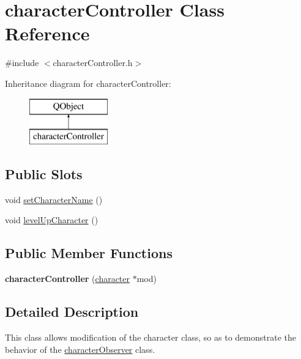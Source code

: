 \hypertarget{classcharacter_controller}{}\section{character\+Controller Class Reference}
\label{classcharacter_controller}


{\ttfamily \#include $<$character\+Controller.\+h$>$}

Inheritance diagram for character\+Controller\+:\begin{figure}[H]
\begin{center}
\leavevmode
\includegraphics[height=2.000000cm]{classcharacter_controller}
\end{center}
\end{figure}
\subsection*{Public Slots}
\begin{DoxyCompactItemize}
\item 
void \hyperlink{classcharacter_controller_a4a3fa0e57a91c304be2adc2240041441}{set\+Character\+Name} ()
\item 
void \hyperlink{classcharacter_controller_a70eba4e82bdb8795f21a96be2f742fa0}{level\+Up\+Character} ()
\end{DoxyCompactItemize}
\subsection*{Public Member Functions}
\begin{DoxyCompactItemize}
\item 
\hypertarget{classcharacter_controller_aa49479f3b344083a024b94058f90c2cd}{}\label{classcharacter_controller_aa49479f3b344083a024b94058f90c2cd} 
{\bfseries character\+Controller} (\hyperlink{classcharacter}{character} $\ast$mod)
\end{DoxyCompactItemize}


\subsection{Detailed Description}
This class allows modification of the character class, so as to demonstrate the behavior of the \hyperlink{classcharacter_observer}{character\+Observer} class. 

